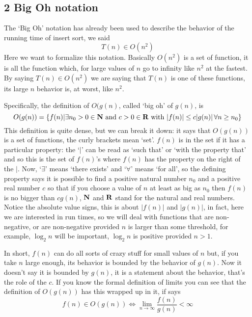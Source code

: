 \documentclass[11pt,a4paper]{scrartcl}
\begin{document}
\subsection*{2 Big Oh notation}

The \lq{}Big Oh\rq{} notation has already been used to describe the
behavior of the running time of insert sort, we said
\begin{equation}
T(n)\in O(n^2)
\end{equation}
Here we want to formalize this notation. Basically $O(n^2)$ is a set
of function, it is all the function which, for large values of $n$ go
to infinity like $n^2$ at the fastest. By saying $T(n)\in O(n^2)$ we
are saying that $T(n)$ is one of these functions, its large $n$
behavior is, at worst, like $n^2$. 

Specifically, the definition of $O(g(n)$, called \lq{}big oh\rq{} of
$g(n)$, is
\begin{equation}
O(g(n))=\{f(n)| \exists n_0>0\in {\bf N}\mbox{ and }c>0\in {\bf R}\mbox{ with }|f(n)|\le c|g(n)|\,\forall n\ge n_0\}
\end{equation}
This definition is quite dense, but we can break it down: it says that
$O(g(n))$ is a set of functions, the curly brackets mean
\lq{}set\rq{}. $f(n)$ is in the set if it has a particular
property: the \lq$|$\rq{} can be read as \lq{}such that\rq{} or
\lq{}with the property that\rq{} and so this is the set of $f(n)$'s
where $f(n)$ has the property on the right of the $|$. Now,
\lq{}$\exists$\rq{} means \lq{}there exists\rq{} and
\lq{}$\forall$\rq{} means \lq{}for all\rq{}, so the defining property
says it is possible to find a positive natural number $n_0$ and a
positive real number $c$ so that if you choose a value of $n$ at
least as big as $n_0$ then $f(n)$ is no bigger than $cg(n)$, ${\bf N}$
and ${\bf R}$ stand for the natural and real numbers. Notice the
absolute value signs, this is about $|f(n)|$ and $|g(n)|$, in fact,
here we are interested in run times, so we will deal with functions
that are non-negative, or are non-negative provided $n$ is larger than
some threshold, for example, $\log_2{n}$ will be important,
$\log_2{n}$ is positive provided $n>1$.

In short, $f(n)$ can do all sorts of crazy stuff for small values of
$n$ but, if you take $n$ large enough, its behavior is bounded by the
behavior of $g(n)$. Now it doesn't say it is bounded by $g(n)$, it is
a statement about the behavior, that's the role of the $c$. If you
know the formal definition of limits you can see that the definition
of $O(g(n))$ has this wrapped up in it, if says
\begin{equation}
f(n)\in O(g(n))\iff \lim_{n\rightarrow \infty}\frac{f(n)}{g(n)}<\infty
\end{equation}
\end{document}
